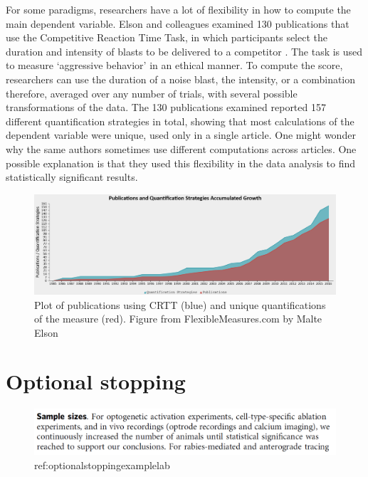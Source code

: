\documentclass[
  oneside]{book}
\begin{document}
For some paradigms, researchers have a lot of flexibility in how to compute the main dependent variable. Elson and colleagues examined 130 publications that use the Competitive Reaction Time Task, in which participants select the duration and intensity of blasts to be delivered to a competitor \citep{elson_press_2014}. The task is used to measure `aggressive behavior' in an ethical manner. To compute the score, researchers can use the duration of a noise blast, the intensity, or a combination therefore, averaged over any number of trials, with several possible transformations of the data. The 130 publications examined reported 157 different quantification strategies in total, showing that most calculations of the dependent variable were unique, used only in a single article. One might wonder why the same authors sometimes use different computations across articles. One possible explanation is that they used this flexibility in the data analysis to find statistically significant results.



\begin{figure}

{\centering \includegraphics[width=1\linewidth]{images/flexiblemeasure} 

}

\caption{Plot of publications using CRTT (blue) and unique quantifications of the measure (red). Figure from FlexibleMeasures.com by Malte Elson}\label{fig:flexiblemeasure}
\end{figure}

\hypertarget{optionalstopping}{%
\section{Optional stopping}\label{optionalstopping}}



\begin{figure}

{\centering \includegraphics[width=1\linewidth]{images/optionalstoppingexample} 

}

\caption{ref:optionalstoppingexamplelab}\label{fig:optionalstoppingexample}
\end{figure}
\end{document}
